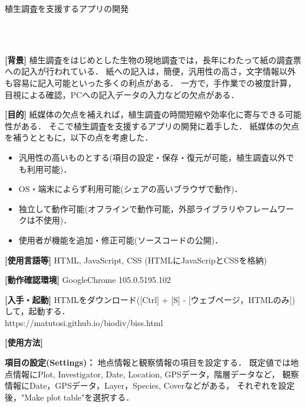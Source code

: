 \documentclass[11pt]{jsarticle}
\begin{document}
\Large

\centerline{植生調査を支援するアプリの開発}

　\\[-12mm]

\normalsize
{}

　\\[-8mm]

\noindent
\textbf{[背景]}
植生調査をはじめとした生物の現地調査では，長年にわたって紙の調査票への記入が行われている．
紙への記入は，簡便，汎用性の高さ，文字情報以外も容易に記入可能といった多くの利点がある．
一方で，手作業での被度計算，目視による確認，PCへの記入データの入力などの欠点がある．

\noindent
\textbf{[目的]}
紙媒体の欠点を補えれば，植生調査の時間短縮や効率化に寄与できる可能性がある．
そこで植生調査を支援するアプリの開発に着手した．
紙媒体の欠点を補うとともに，以下の点を考慮した．
\vspace{-0.5\baselineskip}
\begin{itemize}
\item 汎用性の高いものとする(項目の設定・保存・復元が可能，植生調査以外でも利用可能)．
\item OS・端末によらず利用可能(シェアの高いブラウザで動作)．
\item 独立して動作可能(オフラインで動作可能，外部ライブラリやフレームワークは不使用)．
\item 使用者が機能を追加・修正可能(ソースコードの公開)．
\end{itemize}
\vspace{-0.5\baselineskip}

\noindent
\textbf{[使用言語等]}
HTML, JavaScript, CSS (HTMLにJavaScripとCSSを格納)

\noindent
\textbf{[動作確認環境]}
GoogleChrome 105.0.5195.102

\noindent
\textbf{[入手・起動]}
HTMLをダウンロード([Ctrl] + [S] - [ウェブページ，HTMLのみ])して，起動する．\\
https://matutosi.github.io/biodiv/biss.html

\noindent
\textbf{[使用方法]}

\noindent
\textbf{項目の設定(Settings)：}
地点情報と観察情報の項目を設定する．
既定値では地点情報にPlot, Investigator, Date, Location, GPSデータ，階層データなど，
観察情報にDate，GPSデータ，Layer，Species, Coverなどがある，
それぞれを設定後，"Make plot table"を選択する．
\end{document}
